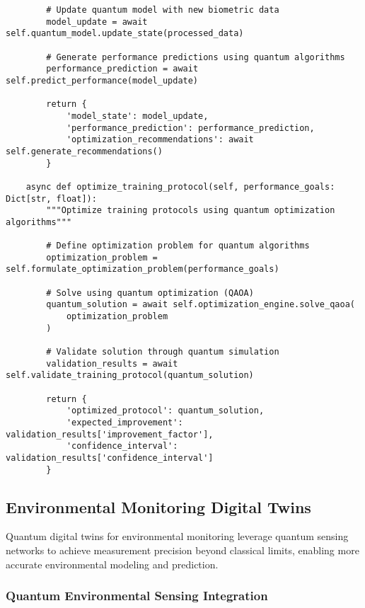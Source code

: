 \documentclass[12pt,a4paper]{report}
\begin{document}
\begin{lstlisting}
        # Update quantum model with new biometric data
        model_update = await self.quantum_model.update_state(processed_data)

        # Generate performance predictions using quantum algorithms
        performance_prediction = await self.predict_performance(model_update)

        return {
            'model_state': model_update,
            'performance_prediction': performance_prediction,
            'optimization_recommendations': await self.generate_recommendations()
        }

    async def optimize_training_protocol(self, performance_goals: Dict[str, float]):
        """Optimize training protocols using quantum optimization algorithms"""

        # Define optimization problem for quantum algorithms
        optimization_problem = self.formulate_optimization_problem(performance_goals)

        # Solve using quantum optimization (QAOA)
        quantum_solution = await self.optimization_engine.solve_qaoa(
            optimization_problem
        )

        # Validate solution through quantum simulation
        validation_results = await self.validate_training_protocol(quantum_solution)

        return {
            'optimized_protocol': quantum_solution,
            'expected_improvement': validation_results['improvement_factor'],
            'confidence_interval': validation_results['confidence_interval']
        }
\end{lstlisting}

\subsection{Environmental Monitoring Digital Twins}

Quantum digital twins for environmental monitoring leverage quantum sensing networks to achieve measurement precision beyond classical limits, enabling more accurate environmental modeling and prediction.

\subsubsection{Quantum Environmental Sensing Integration}
\end{document}
